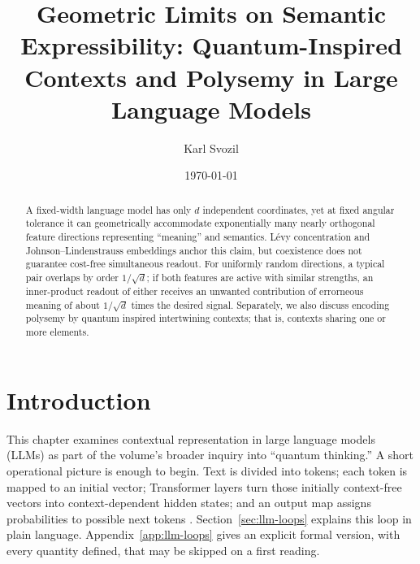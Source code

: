 \documentclass[
  aps,
  reprint,
  superscriptaddress,
  floatfix,
  nofootinbib,
  longbibliography
]{revtex4-2}
\begin{document}
\title{Geometric Limits on Semantic Expressibility: Quantum-Inspired Contexts and Polysemy in Large Language Models}

\author{Karl Svozil}

\date{\today}

\begin{abstract}
A fixed-width language model has only $d$ independent coordinates, yet at fixed
angular tolerance it can geometrically accommodate exponentially many nearly
orthogonal feature directions representing ``meaning'' and semantics.  L\'evy concentration and
Johnson--Lindenstrauss embeddings anchor this claim, but coexistence does not
guarantee cost-free simultaneous readout.  For uniformly random
directions, a typical pair overlaps by order $1/\sqrt d$; if both features are
active with similar strengths, an inner-product readout of either receives an
unwanted contribution of errorneous meaning of about $1/\sqrt d$ times the desired signal.  Separately,
we also discuss encoding polysemy by quantum inspired intertwining contexts; that is, contexts sharing one or more elements.
\end{abstract}

\maketitle


\section{Introduction}
\label{sec:intro}

This chapter examines contextual representation in large language models
(LLMs) as part of the volume's broader inquiry into ``quantum thinking.''  A
short operational picture is enough to begin.  Text is divided into tokens;
each token is mapped to an initial vector; Transformer layers turn those
initially context-free vectors into context-dependent hidden states; and an
output map assigns probabilities to possible next tokens
\cite{Vaswani-2017-Attention}.  Section~\ref{sec:llm-loops} explains this loop
in plain language.  Appendix~\ref{app:llm-loops} gives an explicit formal
version, with every quantity defined, that may be skipped on a first reading.
\end{document}
